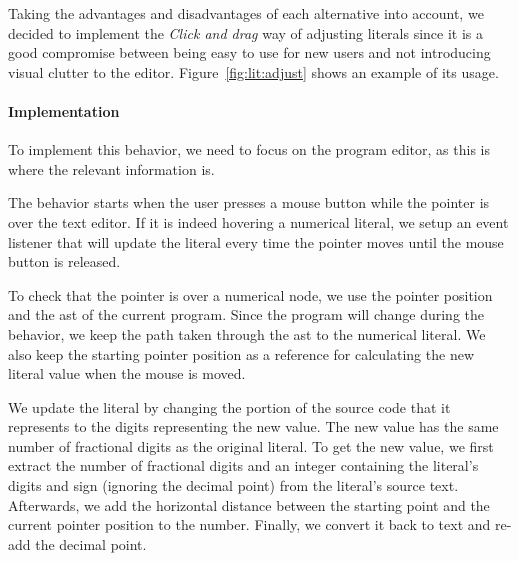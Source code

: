 Taking the advantages and disadvantages of each alternative into account, we decided to implement the {\it Click and drag} way of adjusting literals since it is a good compromise between being easy to use for new users and not introducing visual clutter to the editor.
Figure~\ref{fig:lit:adjust} shows an example of its usage.

\paragraph{Implementation}
To implement this behavior, we need to focus on the program editor, as this is where the relevant information is.

The behavior starts when the user presses a mouse button while the pointer is over the text editor.
If it is indeed hovering a numerical literal, we setup an event listener that will update the literal every time the pointer moves until the mouse button is released.

To check that the pointer is over a numerical node, we use the pointer position and the \gls{ast} of the current program.
Since the program will change during the behavior, we keep the path taken through the \gls{ast} to the numerical literal.
We also keep the starting pointer position as a reference for calculating the new literal value when the mouse is moved.

We update the literal by changing the portion of the source code that it represents to the digits representing the new value.
The new value has the same number of fractional digits as the original literal.
To get the new value, we first extract the number of fractional digits and an integer containing the literal's digits and sign (ignoring the decimal point) from the literal's source text.
Afterwards, we add the horizontal distance between the starting point and the current pointer position to the number.
Finally, we convert it back to text and re-add the decimal point.

